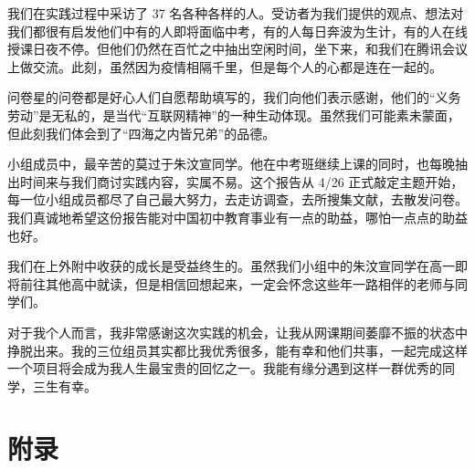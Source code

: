 \documentclass[12pt,UTF8]{ctexart}
\begin{document}
\par {
	我们在实践过程中采访了 37
	名各种各样的人。受访者为我们提供的观点、想法对我们都很有启发他们中有的人即将面临中考，有的人每日奔波为生计，有的人在线授课日夜不停。但他们仍然在百忙之中抽出空闲时间，坐下来，和我们在腾讯会议上做交流。此刻，虽然因为疫情相隔千里，但是每个人的心都是连在一起的。
}
\par {
	
	问卷星的问卷都是好心人们自愿帮助填写的，我们向他们表示感谢，他们的“义务劳动”是无私的，是当代“互联网精神”的一种生动体现。虽然我们可能素未蒙面，但此刻我们体会到了“四海之内皆兄弟”的品德。
}
\par {
	小组成员中，最辛苦的莫过于朱汶宣同学。他在中考班继续上课的同时，也每晚抽出时间来与我们商讨实践内容，实属不易。这个报告从 4/26
	正式敲定主题开始，每一位小组成员都尽了自己最大努力，去走访调查，去所搜集文献，去散发问卷。我们真诚地希望这份报告能对中国初中教育事业有一点的助益，哪怕一点点的助益也好。
}
\par {
	我们在上外附中收获的成长是受益终生的。虽然我们小组中的朱汶宣同学在高一即将前往其他高中就读，但是相信回想起来，一定会怀念这些年一路相伴的老师与同学们。
}
\par {
	
	对于我个人而言，我非常感谢这次实践的机会，让我从网课期间萎靡不振的状态中挣脱出来。我的三位组员其实都比我优秀很多，能有幸和他们共事，一起完成这样一个项目将会成为我人生最宝贵的回忆之一。我能有缘分遇到这样一群优秀的同学，三生有幸。
}

\newpage
\section {附录}
\end{document}
